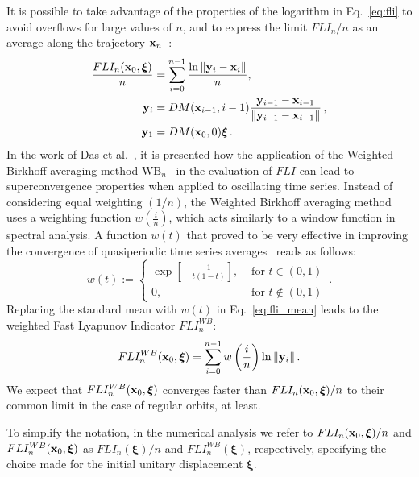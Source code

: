 It is possible to take advantage of the properties of the logarithm in Eq.~\eqref{eq:fli} to avoid overflows for large values of $n$, and to express the limit $FLI_n/n$ as an average along the trajectory ${\bf x}_n$~\cite{Alligood1996}:
%
\begin{equation}
\begin{aligned}
    \frac{FLI_n(\vb{x}_0, \boldsymbol{\xi})}{n} &= \sum_{i=0}^{n-1} \frac{\ln{\norm{\vb{y}_i-\vb{x}_i}}}{n},\\ 
    \vb{y}_i &= DM(\vb{x}_{i-1}, i-1)\frac{\vb{y}_{i-1}-\vb{x}_{i-1}}{\norm{\vb{y}_{i-1}-\vb{x}_{i-1}}} \,,\\
    \vb{y}_1 &= DM(\vb{x}_0, 0)\boldsymbol{\xi}\,.
    \label{eq:fli_mean}
\end{aligned}
\end{equation}
%
In the work of Das et al.~\cite{Das_2017}, it is presented how the application of the Weighted Birkhoff averaging method $\mathrm{WB}_n$~\cite{Das_2018} in the evaluation of $FLI$ can lead to superconvergence properties when applied to oscillating time series. Instead of considering equal weighting $(1/n)$, the Weighted Birkhoff averaging method uses a weighting function $w\left(\frac{i}{n}\right)$, which acts similarly to a window function in spectral analysis. A function $w(t)$ that proved to be very effective in improving the convergence of quasiperiodic time series averages~\cite{Das_2018} reads as follows:
%
\begin{equation}
    w(t):= 
    \begin{cases}
        \exp \left[-\frac{1}{t(1-t)}\right], & \text { for } t \in(0,1) \\ 
        0, & \text { for } t \notin(0,1)
    \end{cases} \,.
    \label{eq:birkhoff}
\end{equation}
%
Replacing the standard mean with $w(t)$ in Eq.~\eqref{eq:fli_mean} leads to the weighted Fast Lyapunov Indicator $FLI_n^{WB}$:
%
\begin{equation}
    FLI_n^{WB}(\vb{x}_0, \boldsymbol{\xi}) = \sum_{i=0}^{n-1} w\left(\frac{i}{n}\right) \ln{\norm{\vb{y}_i}} \, .
    \label{eq:fli_birkhoff}
\end{equation}
%
We expect that $FLI_n^{WB}(\vb{x}_0, \boldsymbol{\xi})$ converges faster than $FLI_n(\vb{x}_0, \boldsymbol{\xi})/n$ to their common limit in the case of regular orbits, at least.

To simplify the notation, in the numerical analysis we refer to $FLI_n(\vb{x}_0, \boldsymbol{\xi})/n$ and $FLI_n^{WB}(\vb{x}_0, \boldsymbol{\xi})$ as $FLI_n(\boldsymbol{\xi})/n$ and $FLI_n^{WB}(\boldsymbol{\xi})$, respectively, specifying the choice made for the initial unitary displacement $\boldsymbol{\xi}$. 
%
